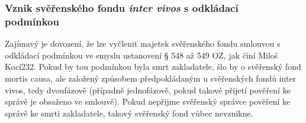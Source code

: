 \documentclass{article}
\begin{document}







\subsubsection[Vznik svěřenského fondu \textit{inter vivos} s odkládacé podmínkou]{Vznik svěřenského fondu \textit{inter vivos} s odkládací\\ podmínkou}



Zajímavý je dovození, že lze vyčlenit majetek svěřenského fondu smlouvou s odkládací podmínkou ve smyslu ustanovení § 548 až 549 OZ, jak činí Miloš Kocí232. Pokud by tou podmínkou byla smrt zakladatele, šlo by o svěřenský fond mortis causa, ale založený způsobem předpokládaným u svěřenských fondů inter vivos, tedy dvoufázově (případně jednofázově, pokud takové přijetí pověření ke správě je obsaženo ve smlouvě). Pokud nepřijme svěřenský správce pověření ke správě ke smrti zakladatele, takový svěřenský fond vůbec nevznikne.
\end{document}
